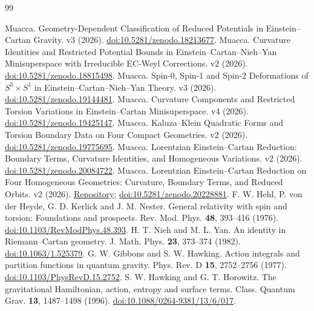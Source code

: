 \documentclass[11pt,a4paper]{article}
\begin{document}
\begin{thebibliography}{99}\footnotesize\raggedright
\setlength{\itemsep}{1pt}\setlength{\parsep}{0pt}
 Muacca. Geometry-Dependent Classification of Reduced Potentials in Einstein--Cartan Gravity. v3 (2026). \href{https://doi.org/10.5281/zenodo.18213677}{doi:10.5281/zenodo.18213677}.
 Muacca. Curvature Identities and Restricted Potential Bounds in Einstein--Cartan--Nieh--Yan Minisuperspace with Irreducible EC-Weyl Corrections. v2 (2026). \href{https://doi.org/10.5281/zenodo.18815498}{doi:10.5281/zenodo.18815498}.
 Muacca. Spin-0, Spin-1 and Spin-2 Deformations of $S^3\times S^1$ in Einstein--Cartan--Nieh--Yan Theory. v3 (2026). \href{https://doi.org/10.5281/zenodo.19144481}{doi:10.5281/zenodo.19144481}.
 Muacca. Curvature Components and Restricted Torsion Variations in Einstein--Cartan Minisuperspace. v4 (2026). \href{https://doi.org/10.5281/zenodo.19425147}{doi:10.5281/zenodo.19425147}.
 Muacca. Kaluza--Klein Quadratic Forms and Torsion Boundary Data on Four Compact Geometries. v2 (2026). \href{https://doi.org/10.5281/zenodo.19775695}{doi:10.5281/zenodo.19775695}.
 Muacca. Lorentzian Einstein--Cartan Reduction: Boundary Terms, Curvature Identities, and Homogeneous Variations. v2 (2026). \href{https://doi.org/10.5281/zenodo.20084722}{doi:10.5281/zenodo.20084722}.
 Muacca. Lorentzian Einstein--Cartan Reduction on Four Homogeneous Geometries: Curvature, Boundary Terms, and Reduced Orbits. v2 (2026). \href{https://github.com/Muacca/DPPUv7-paper06}{Repository}; \href{https://doi.org/10.5281/zenodo.20228881}{doi:10.5281/zenodo.20228881}.
 F. W. Hehl, P. von der Heyde, G. D. Kerlick and J. M. Nester. General relativity with spin and torsion: Foundations and prospects. Rev. Mod. Phys. \textbf{48}, 393--416 (1976). \href{https://doi.org/10.1103/RevModPhys.48.393}{doi:10.1103/RevModPhys.48.393}.
 H. T. Nieh and M. L. Yan. An identity in Riemann--Cartan geometry. J. Math. Phys. \textbf{23}, 373--374 (1982). \href{https://doi.org/10.1063/1.525379}{doi:10.1063/1.525379}.
 G. W. Gibbons and S. W. Hawking. Action integrals and partition functions in quantum gravity. Phys. Rev. D \textbf{15}, 2752--2756 (1977). \href{https://doi.org/10.1103/PhysRevD.15.2752}{doi:10.1103/PhysRevD.15.2752}.
 S. W. Hawking and G. T. Horowitz. The gravitational Hamiltonian, action, entropy and surface terms. Class. Quantum Grav. \textbf{13}, 1487--1498 (1996). \href{https://doi.org/10.1088/0264-9381/13/6/017}{doi:10.1088/0264-9381/13/6/017}.

\end{thebibliography}
\end{document}
